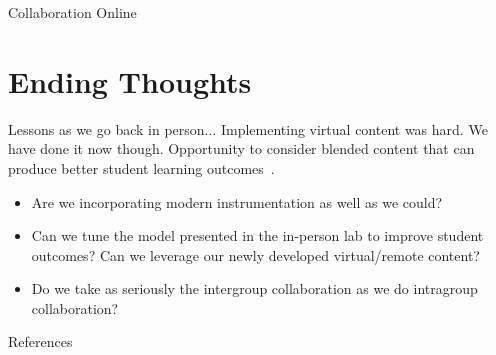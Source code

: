 \documentclass{beamer}
\begin{document}
\begin{frame}{Collaboration Online}
  \begin{center}
  \end{center}
\end{frame}

\section{Ending Thoughts}

\begin{frame}{Lessons as we go back in person...}
  Implementing virtual content was hard. We have done it now though.
  \pause
  Opportunity to consider blended content that can produce better student learning outcomes~\cite{Bumbacher2017, Olympiou2011}.
  \pause
  \begin{itemize}
    \item{
      Are we incorporating modern instrumentation as well as we could?
    }
    \pause
    \item{
      Can we tune the model presented in the in-person lab to improve student outcomes? Can we leverage our newly developed virtual/remote content?
    }
    \pause
    \item{
      Do we take as seriously the intergroup collaboration as we do intragroup collaboration?
    }
  \end{itemize}
\end{frame}

\renewcommand*{\bibfont}{\tiny}
\begin{frame}{References}{}
\printbibliography
\end{frame}
\end{document}
